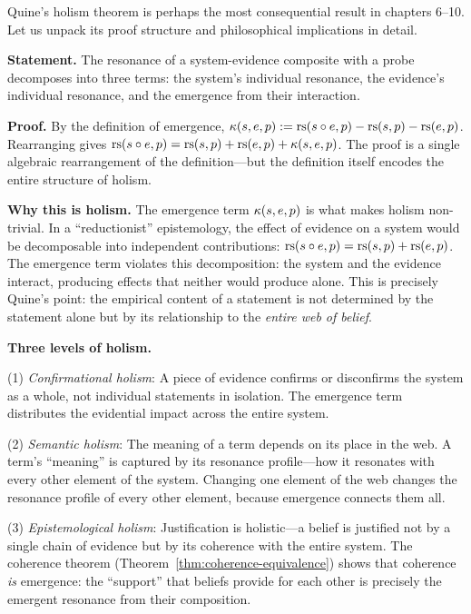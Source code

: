 \begin{remark}
Quine's holism theorem is perhaps the most consequential result in chapters 6--10.
Let us unpack its proof structure and philosophical implications in detail.

\textbf{Statement.} The resonance of a system-evidence composite with a probe
decomposes into three terms: the system's individual resonance, the evidence's
individual resonance, and the emergence from their interaction.

\textbf{Proof.} By the definition of emergence, $\kappa(s, e, p) :=
\mathrm{rs}(s \circ e, p) - \mathrm{rs}(s, p) - \mathrm{rs}(e, p)$. Rearranging gives
$\mathrm{rs}(s \circ e, p) = \mathrm{rs}(s, p) + \mathrm{rs}(e, p) + \kappa(s, e, p)$. The proof
is a single algebraic rearrangement of the definition---but the definition
itself encodes the entire structure of holism.

\textbf{Why this is holism.} The emergence term $\kappa(s, e, p)$ is what
makes holism non-trivial. In a ``reductionist'' epistemology, the effect of
evidence on a system would be decomposable into independent contributions:
$\mathrm{rs}(s \circ e, p) = \mathrm{rs}(s, p) + \mathrm{rs}(e, p)$. The emergence term violates
this decomposition: the system and the evidence interact, producing effects
that neither would produce alone. This is precisely Quine's point: the
empirical content of a statement is not determined by the statement alone
but by its relationship to the \emph{entire web of belief}.

\textbf{Three levels of holism.}

(1) \emph{Confirmational holism}: A piece of evidence confirms or disconfirms
the system as a whole, not individual statements in isolation. The emergence
term distributes the evidential impact across the entire system.

(2) \emph{Semantic holism}: The meaning of a term depends on its place in the
web. A term's ``meaning'' is captured by its resonance profile---how it
resonates with every other element of the system. Changing one element of the
web changes the resonance profile of every other element, because emergence
connects them all.

(3) \emph{Epistemological holism}: Justification is holistic---a belief is
justified not by a single chain of evidence but by its coherence with the
entire system. The coherence theorem (Theorem~\ref{thm:coherence-equivalence})
shows that coherence \emph{is} emergence: the ``support'' that beliefs provide
for each other is precisely the emergent resonance from their composition.
\end{remark}

